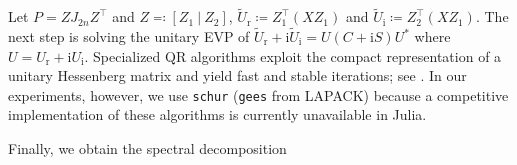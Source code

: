\documentclass[final,onefignum,onetabnum,dvipsnames]{siamart251216}
\numberwithin{algorithm}{section}
\numberwithin{equation}{section}
\newcommand{\SM}[1]{\textcolor{orange}{SM: #1}}
\begin{document}
Let $P = ZJ_{2n} Z^\top$ and $Z\eqcolon [Z_1\ | \ Z_2]$, $\widetilde{U}_\mathrm{r}\coloneq  Z_1^\top (X Z_1)$ and $\widetilde{U}_\mathrm{i}\coloneq Z_2^\top (X Z_1) $. The next step is solving the unitary EVP of $\widetilde{U}_\mathrm{r} + \mathrm{i}\widetilde{U}_\mathrm{i}= U(C+\mathrm{i}S)U^*$ where $U = U_\mathrm{r} + \mathrm{i} U_\mathrm{i}$. Specialized QR algorithms exploit the compact representation of a
unitary Hessenberg matrix and yield fast and stable iterations; see
\cite{Gragg1986,Stewart2006}. In our experiments, however, we use \texttt{schur} (\texttt{gees} from LAPACK) because a competitive implementation of these algorithms is currently unavailable in Julia.


Finally, we obtain the spectral decomposition
\end{document}
